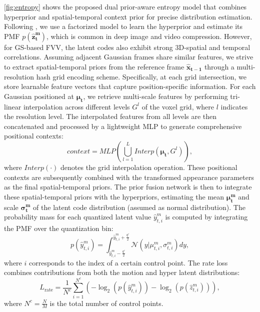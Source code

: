 \documentclass[letterpaper]{article} %
\begin{document}
\cref{fig:entropy} shows the proposed dual prior-aware entropy model that combines hyperprior and spatial-temporal context prior for precise distribution estimation. 
Following \cite{balle2018variational}, we use a factorized model to learn the hyperprior and estimate its PMF $p(\boldsymbol{\hat{z}^m_t})$, which is common in deep image and video compression. However, for GS-based FVV, the latent codes also exhibit strong 3D-spatial and temporal correlations. 
Assuming adjacent Gaussian frames share similar features, we strive to extract spatial-temporal priors from the reference frame $\boldsymbol{\hat{x}_{t-1}}$ through a multi-resolution hash grid encoding scheme. Specifically, at each grid intersection, we store learnable feature vectors that capture position-specific information. For each Gaussian positioned at $\boldsymbol{\mu_t}$, we retrieve multi-scale features by performing tri-linear interpolation across different levels $G^l$ of the voxel grid, where $l$ indicates the resolution level. The interpolated features from all levels are then concatenated and processed by a lightweight MLP to generate comprehensive positional contexts:
\begin{equation}
    context = MLP( \bigcup_{l=1}^L Interp(\boldsymbol{\mu_t}, G^l)),
\end{equation}
where $Interp(\cdot)$ denotes the grid interpolation operation. These positional contexts are subsequently combined with the transformed appearance parameters as the final spatial-temporal priors. The prior fusion network is then to integrate these spatial-temporal priors with the hyperpriors, estimating the mean $\boldsymbol{\mu^m_t}$ and scale $\boldsymbol{\sigma^m_t}$ of the latent code distribution (assumed as normal distribution). The probability mass for each quantized latent value $\hat{y}^m_{t,i}$ is computed by integrating the PMF over the quantization bin:
\begin{equation}
    p(\hat{y}^m_{t, i}) = \int_{\hat{y}^m_{t, i} - \frac{q'}{2}} ^ {\hat{y}^m_{t, i} + \frac{q'}{2}} \mathcal{N}(y|\mu^m_{t, i}, \sigma^m_{t, i}) dy,
\end{equation}
where $i$ corresponds to the index of a certain control point. The rate loss combines contributions from both the motion and hyper latent distributions:
\begin{equation}
    L_{\text{rate}} = \frac{1}{N^c} \sum_{i=1}^{N^c} (-\log_2( p(\hat{y}^m_{t, i}))  -\log_2(p(\hat{z}^m_{t, i}))),
\end{equation}
where $N^c = \frac{N}{M}$ is the total number of control points.
\end{document}
